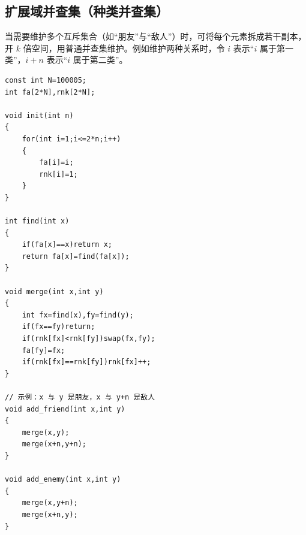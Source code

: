 \subsection{扩展域并查集（种类并查集）}

\par \noindent 当需要维护多个互斥集合（如“朋友”与“敌人”）时，可将每个元素拆成若干副本，开 $k$ 倍空间，用普通并查集维护。例如维护两种关系时，令 $i$ 表示“$i$ 属于第一类”，$i+n$ 表示“$i$ 属于第二类”。

\begin{verbatim}
const int N=100005;
int fa[2*N],rnk[2*N];

void init(int n)
{
    for(int i=1;i<=2*n;i++)
    {
        fa[i]=i;
        rnk[i]=1;
    }
}

int find(int x)
{
    if(fa[x]==x)return x;
    return fa[x]=find(fa[x]);
}

void merge(int x,int y)
{
    int fx=find(x),fy=find(y);
    if(fx==fy)return;
    if(rnk[fx]<rnk[fy])swap(fx,fy);
    fa[fy]=fx;
    if(rnk[fx]==rnk[fy])rnk[fx]++;
}

// 示例：x 与 y 是朋友，x 与 y+n 是敌人
void add_friend(int x,int y)
{
    merge(x,y);
    merge(x+n,y+n);
}

void add_enemy(int x,int y)
{
    merge(x,y+n);
    merge(x+n,y);
}
\end{verbatim}